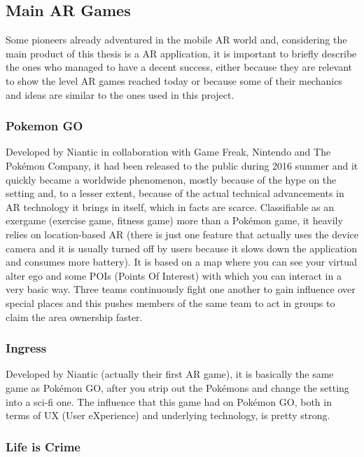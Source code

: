 		\newpage
		
		\subsection{Main AR Games}
		\label{soa:games}
		
			Some pioneers already adventured in the mobile AR world and, considering the main product of this thesis is a AR application, it is important to briefly describe the ones who managed to have a decent success, either because they are relevant to show the level AR games reached today or because some of their mechanics and ideas are similar to the ones used in this project.
		
			\subsubsection{Pokemon GO}
			
				Developed by Niantic in collaboration with Game Freak, Nintendo and The Pokémon Company, it had been released to the public during 2016 summer and it quickly became a worldwide phenomenon, mostly because of the hype on the setting and, to a lesser extent, because of the actual technical advancements in AR technology it brings in itself, which in facts are scarce.
				Classifiable as an exergame (exercise game, fitness game) more than a Pokémon game, it heavily relies on location-based AR (there is just one feature that actually uses the device camera and it is usually turned off by users because it slows down the application and consumes more battery). It is based on a map where you can see your virtual alter ego and some POIs (Points Of Interest) with which you can interact in a very basic way.
				Three teams continuously fight one another to gain influence over special places and this pushes members of the same team to act in groups to claim the area ownership faster.
			
			\subsubsection{Ingress}
			
				Developed by Niantic (actually their first AR game), it is basically the same game as Pokémon GO, after you strip out the Pokémons and change the setting into a sci-fi one.
				The influence that this game had on Pokémon GO, both in terms of UX (User eXperience) and underlying technology, is pretty strong.
			
			\subsubsection{Life is Crime}
			
